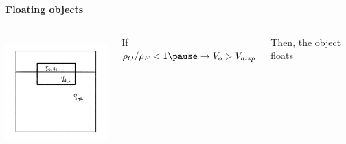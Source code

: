 \documentclass[]{beamer}
\begin{document}
\begin{frame}


\textbf{Floating objects} 

\vspace{3mm}



\begin{columns}[c]
   \column{2in}  %

   \begin{center}
  \includegraphics[height=1.7in]{images2/Buoyance3.jpg}
\end{center}
 
   \column{2in}

   If   $\rho_O/\rho_{F }<1\pause\rightarrow V_o>V_{disp}$ 

   \pause

   \vspace{3mm}
   Then, the object floats

   \end{columns}



  \end{frame}

\end{document}
